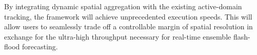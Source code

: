 By integrating dynamic spatial aggregation with the existing active-domain tracking, the framework will achieve unprecedented execution 
speeds. This will allow users to seamlessly trade off a controllable margin of spatial resolution in exchange for the ultra-high 
throughput necessary for real-time ensemble flash-flood forecasting.

